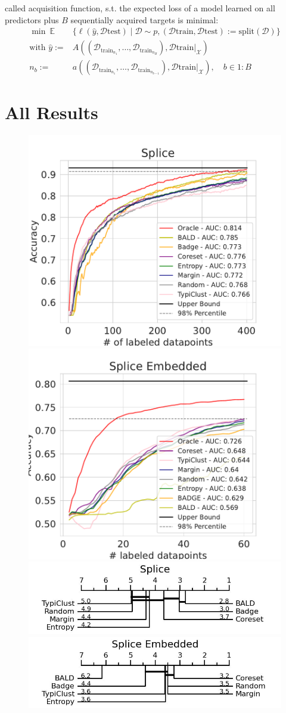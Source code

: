 \documentclass[]{article}
\newcommand{\EE}{\mathbb{E}}
\newcommand{\D}{\mathcal{D}}
\newcommand{\X}{\mathcal{X}}
\newcommand{\test}{\text{test}}
\newcommand{\train}{\text{train}}
\begin{document}
called acquisition function,
s.t. the expected loss of a model learned on all predictors plus $B$ sequentially acquired targets
is minimal:
\begin{align*}
	\min\ \EE\   &  \{
	\ell(\hat y, \D\test)
	\mid \D\sim p, (\D\train,\D\test):= \text{split}(\D) \}
	\\
	\text{with }
	\hat y:= & A( (\D_{\train_{n_1}},\ldots,\D_{\train_{n_B}}), \D\train|_{\X})
	\\ 
	n_b := & a( (\D_{\train_{n_1}},\ldots,\D_{\train_{n_{b-1}}}), \D\train|_{\X}) ,
	\quad b\in 1{:}B
\end{align*}

\section{All Results}\label{app:all_results}
\begin{figure}[H]
	\centering
	\includegraphics[width=0.49\linewidth]{img/eval_splice}
	\includegraphics[width=0.49\linewidth]{img/eval_splice_enc} \\ [2mm]
	\includegraphics[width=0.49\linewidth]{img/micro_splice.jpg}
	\includegraphics[width=0.49\linewidth]{img/micro_splice_enc.jpg} \\ [4mm]
\end{figure}
\end{document}
